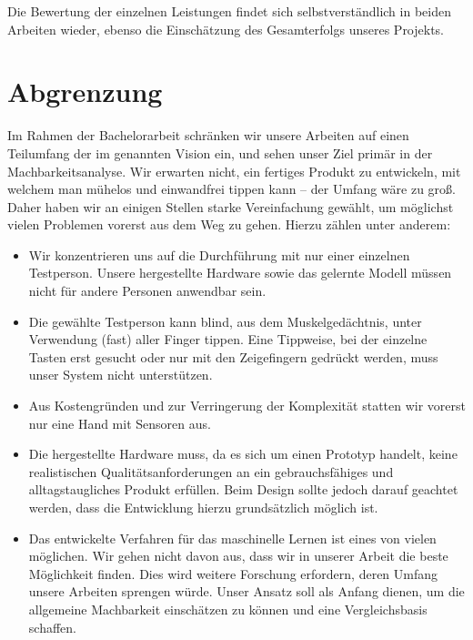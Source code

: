 Die Bewertung der einzelnen Leistungen findet sich selbstverständlich in beiden
Arbeiten wieder, ebenso die Einschätzung des Gesamterfolgs unseres Projekts.

\section{Abgrenzung} 

Im Rahmen der Bachelorarbeit schränken wir unsere Arbeiten auf einen Teilumfang
der im  genannten Vision ein, und sehen unser Ziel primär in der
Machbarkeitsanalyse. Wir erwarten nicht, ein fertiges Produkt zu entwickeln,
mit welchem man mühelos und einwandfrei tippen kann -- der Umfang wäre zu groß.
Daher haben wir an einigen Stellen starke Vereinfachung gewählt, um möglichst
vielen Problemen vorerst aus dem Weg zu gehen. Hierzu zählen unter anderem:

\begin{itemize}
    \item Wir konzentrieren uns auf die Durchführung mit nur einer einzelnen
        Testperson. Unsere hergestellte Hardware sowie das gelernte Modell
        müssen nicht für andere Personen anwendbar sein.
    \item Die gewählte Testperson kann blind, aus dem Muskelgedächtnis,
        unter Verwendung (fast) aller Finger tippen. Eine Tippweise, bei der
        einzelne Tasten erst gesucht oder nur mit den Zeigefingern gedrückt
        werden, muss unser System nicht unterstützen.
    \item Aus Kostengründen und zur Verringerung der Komplexität statten wir
        vorerst nur eine Hand mit Sensoren aus.
    \item Die hergestellte Hardware muss, da es sich um einen Prototyp
        handelt, keine realistischen Qualitätsanforderungen an ein
        gebrauchsfähiges und alltagstaugliches Produkt erfüllen. Beim Design
        sollte jedoch darauf geachtet werden, dass die Entwicklung hierzu
        grundsätzlich möglich ist.
    \item Das entwickelte Verfahren für das maschinelle Lernen ist eines
        von vielen möglichen. Wir gehen nicht davon aus, dass wir in unserer
        Arbeit die beste Möglichkeit finden. Dies wird weitere Forschung
        erfordern, deren Umfang unsere Arbeiten sprengen würde. Unser Ansatz
        soll als Anfang dienen, um die allgemeine Machbarkeit einschätzen zu
        können und eine Vergleichsbasis schaffen.
\end{itemize}

